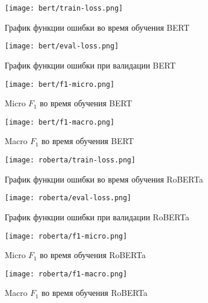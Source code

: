 \begin{figure}[!htb] 
   \begin{minipage}{0.48\textwidth} 
     \centering 
     \texttt{[image: bert/train-loss.png]}
     \caption{График функции ошибки во время обучения BERT} 
   \end{minipage}\hfill 
   \begin{minipage}{0.48\textwidth} 
     \centering 
     \texttt{[image: bert/eval-loss.png]}
     \caption{График функции ошибки при валидации BERT} 
   \end{minipage} 
\end{figure}

\begin{figure}[!htb] 
   \begin{minipage}{0.48\textwidth} 
     \centering 
     \texttt{[image: bert/f1-micro.png]}
     \caption{Micro $F_1$ во время обучения BERT} 
   \end{minipage}\hfill 
   \begin{minipage}{0.48\textwidth} 
     \centering 
     \texttt{[image: bert/f1-macro.png]}
     \caption{Macro $F_1$ во время обучения BERT} 
   \end{minipage} 
\end{figure}

\begin{figure}[!htb] 
   \begin{minipage}{0.48\textwidth} 
     \centering 
     \texttt{[image: roberta/train-loss.png]}
     \caption{График функции ошибки во время обучения RoBERTa} 
   \end{minipage}\hfill 
   \begin{minipage}{0.48\textwidth} 
     \centering 
     \texttt{[image: roberta/eval-loss.png]}
     \caption{График функции ошибки при валидации RoBERTa} 
   \end{minipage} 
\end{figure}

\begin{figure}[!htb] 
   \begin{minipage}{0.48\textwidth} 
     \centering 
     \texttt{[image: roberta/f1-micro.png]}
     \caption{Micro $F_1$ во время обучения RoBERTa} 
   \end{minipage}\hfill 
   \begin{minipage}{0.48\textwidth} 
     \centering 
     \texttt{[image: roberta/f1-macro.png]}
     \caption{Macro $F_1$ во время обучения RoBERTa} 
   \end{minipage} 
\end{figure}

